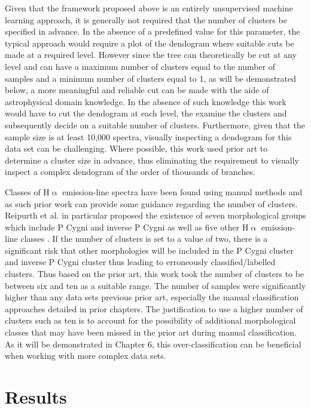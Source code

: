 Given that the framework proposed above is an entirely unsupervised machine learning approach, it is generally not required that the number of clusters be specified in advance. In the absence of a predefined value for this parameter, the typical approach would require a plot of the dendogram where suitable cuts be made at a required level. However since the tree can theoretically be cut at any level and can have a maximum number of clusters equal to the number of samples and a minimum number of clusters equal to 1, as will be demonstrated below, a more meaningful and reliable cut can be made with the aide of astrophysical domain knowledge. In the absence of such knowledge this work would have to cut the dendogram at each level, the examine the clusters and subsequently decide on a suitable number of clusters. Furthermore, given that the sample size is at least 10,000 spectra, visually inspecting a dendogram for this data set can be challenging. Where possible, this work used prior art to determine a cluster size in advance, thus eliminating the requirement to visually inspect a complex dendogram of the order of thousands of branches. 

Classes of H$\upalpha$ emission-line spectra have been found using manual methods and as such prior work can provide some guidance regarding the number of clusters. Reipurth et al. in particular proposed the existence of seven morphological groups which include P Cygni and inverse P Cygni as well as five other H$\upalpha$ emission-line classes \cite{reipurth1996hupalpha}. If the number of clusters is set to a value of two, there is a significant risk that other morphologies will be included in the P Cygni cluster and inverse P Cygni cluster thus leading to erroneously classified/labelled clusters. Thus based on the prior art, this work took the number of clusters to be between six and ten as a suitable range. The number of samples were significantly higher than any data sets previous prior art, especially the manual classification approaches detailed in prior chapters. The justification to use a higher number of clusters such as ten is to account for the possibility of additional morphological classes that may have been missed in the prior art during manual classification. As it will be demonstrated in Chapter 6, this over-classification can be beneficial when working with more complex data sets.

\section{Results}


